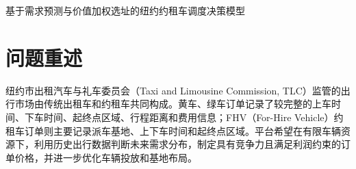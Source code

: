 \documentclass[UTF8,a4paper,12pt]{ctexart}
\newcommand{\keywords}[1]{\par\vspace{0.5em}\noindent\textbf{关键词：}#1}
\begin{document}
\begin{center}
    {\heiti{} 基于需求预测与价值加权选址的纽约约租车调度决策模型}\par
\end{center}


\begin{abstract}
本文围绕纽约约租车平台在布鲁克林区域的运营决策，建立由“需求预测、订单定价、车辆投放、基地选址”组成的闭环调度模型。题目数据中，黄车和绿车记录较完整，可用于刻画市场需求和出租车参考价格；FHV样本规模较小且缺少费用、里程字段，因此本文采用出租车历史规律迁移到FHV决策的建模思路，并通过可解释的优化模型形成运营方案。

针对问题一，本文清洗2019年1月TLC黄车、绿车订单，构造布鲁克林61个TLC区域的区域--小时需求面板。考虑订单量具有非负计数特征，本文建立\textbf{Poisson梯度提升模型}，并与区域--星期--小时历史均值基线融合。验证结果显示，融合模型MAE为1.9167，优于最优历史基线1.9820；据此预测2019年2月1日中午12时布鲁克林出租车出发需求为427.69单，可作为FHV平台潜在可争取需求的上界输入。

针对问题二，本文先利用黄车、绿车费用数据训练出租车参考价格模型，再结合运营成本、最低利润率、竞争折扣和拼车折扣确定FHV订单报价。对115条FHV订单的计算结果表明，平均FHV定价为15.96美元，平均估计成本为10.12美元，平均成本口径利润率为56.18\%，说明该定价方案在保持相对价格竞争力的同时满足基本利润约束。

针对问题三，本文以中午12时预测需求、分区平均利润和单车服务能力为输入，建立\textbf{边际利润驱动的整数车辆分配模型}。当新增车辆数为100时，预计可服务需求294.92单，增量利润为2183.85美元；当新增车辆数为200时，176辆车即可覆盖全部预测需求，剩余24辆应作为备用运力，继续增加车辆不再产生额外利润。

针对问题四，本文针对特殊车型从基地出发服务的特点，建立\textbf{业务价值加权$p$-中位选址模型}，以降低高需求、高利润区域的接驾时间损失。计算得到三处基地区域为Brooklyn Heights、Green-Wood Cemetery所在TLC分区和Starrett City所在TLC分区，相比按需求量直接选取前三个区域的方案，加权派车时间目标值降低约28.00\%。灵敏度分析进一步表明，折扣率、车辆规模和需求转化系数会影响利润上界和饱和车辆数，但不改变“按边际收益投放车辆、按业务价值布局基地”的主要决策逻辑。
\keywords{约租车调度；需求预测；动态定价；车辆分配；$p$-中位模型；边际利润}
\end{abstract}

\clearpage
\tableofcontents
\clearpage

\section{问题重述}
纽约市出租汽车与礼车委员会（Taxi and Limousine Commission, TLC）监管的出行市场由传统出租车和约租车共同构成。黄车、绿车订单记录了较完整的上车时间、下车时间、起终点区域、行程距离和费用信息；FHV（For-Hire Vehicle）约租车订单则主要记录派车基地、上下车时间和起终点区域。平台希望在有限车辆资源下，利用历史出行数据判断未来需求分布，制定具有竞争力且满足利润约束的订单价格，并进一步优化车辆投放和基地布局。
\end{document}
